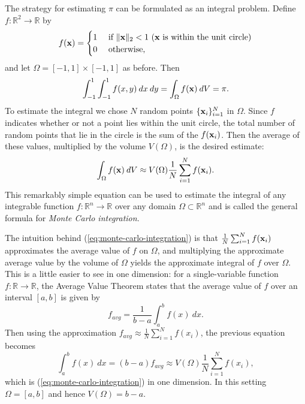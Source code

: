 The strategy for estimating $\pi$ can be formulated as an integral problem.
Define $f:\mathbb{R}^2\rightarrow\mathbb{R}$ by
\begin{equation*}
    f(\mathbf{x}) =
    \begin{cases}
        1 &\mbox{ if $\|\mathbf{x}\|_2 < 1$ ($\mathbf{x}$ is within the unit circle)} \\
        0 &\mbox{ otherwise,}
    \end{cases}
\end{equation*}
and let $\Omega = [-1,1] \times [-1,1]$ as before.
Then
\begin{equation*}
    \int_{-1}^1 \int_{-1}^1 f(x,y)\:dx\:dy = \int_\Omega f(\mathbf{x})\:dV = \pi.
\end{equation*}
To estimate the integral we chose $N$ random points $\{\mathbf{x}_i\}_{i=1}^N$ in $\Omega$.
Since $f$ indicates whether or not a point lies within the unit circle, the total number of random points that lie in the circle is the sum of the $f(\mathbf{x}_i)$.
Then the average of these values, multiplied by the volume $V(\Omega)$, is the desired estimate:
\begin{equation}
    \int_\Omega f(\mathbf{x})\:dV \approx V(\Omega) \frac{1}{N} \sum_{i=1}^N f(\mathbf{x}_i).
\label{eq:monte-carlo-integration}
\end{equation}
This remarkably simple equation can be used to estimate the integral of any integrable function $f:\mathbb{R}^n\rightarrow \mathbb{R}$ over any domain $\Omega \subset \mathbb{R}^n$ and is called the general formula for \emph{Monte Carlo integration}.

The intuition behind (\ref{eq:monte-carlo-integration}) is that $\frac{1}{N} \sum_{i=1}^N f(\mathbf{x}_i)$ approximates the average value of $f$ on $\Omega$, and multiplying the approximate average value by the volume of $\Omega$ yields the approximate integral of $f$ over $\Omega$.
This is a little easier to see in one dimension: for a single-variable function $f:\mathbb{R}\rightarrow\mathbb{R}$, the Average Value Theorem states that the average value of $f$ over an interval $[a,b]$ is given by
\begin{equation*}
    f_{avg} = \frac{1}{b-a}\int_a^b f(x)\:dx.
\end{equation*}
Then using the approximation $f_{avg} \approx \frac{1}{N} \sum_{i=1}^N f(x_i)$, the previous equation becomes
\begin{equation}
    \int_a^b f(x)\:dx = (b - a) f_{avg} \approx V(\Omega)\frac{1}{N}\sum_{i=1}^N f(x_i),
\label{eq:monte-carlo-integration-1d}
\end{equation}
which is (\ref{eq:monte-carlo-integration}) in one dimension.
In this setting $\Omega = [a,b]$ and hence $V(\Omega) = b - a$.

